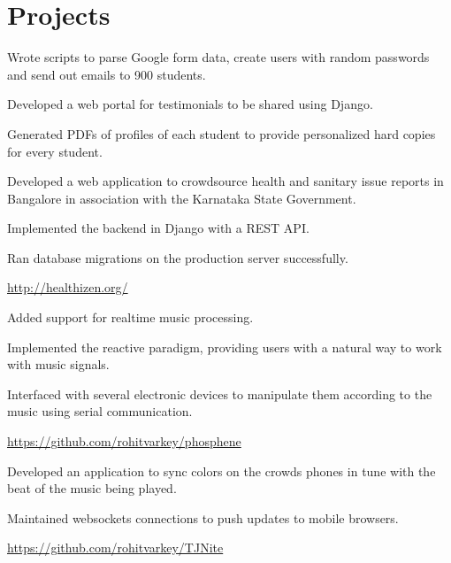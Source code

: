 \documentclass[]{deedy-resume-openfont}
\begin{document}
\begin{minipage}[t]{0.49\textwidth} 

\section{Projects}

\sectionsep
\begin{tightemize}
\item Wrote scripts to parse Google form data, create users with random passwords and send out emails to 900 students.
\item Developed a web portal for testimonials to be shared using Django.
\item Generated PDFs of profiles of each student to provide personalized hard copies for every student.
\end{tightemize}

\begin{tightemize}
\item Developed a web application to crowdsource health and sanitary issue reports in Bangalore in association with the Karnataka State Government.
\item Implemented the backend in Django with a REST API.
\item Ran database migrations on the production server successfully.
\item \href{http://healthizen.org/}{http://healthizen.org/}
\end{tightemize}

\begin{tightemize}
\item Added support for realtime music processing.
\item Implemented the reactive paradigm, providing users with a natural way to work with music signals.
\item Interfaced with several electronic devices to manipulate them according to the music using serial communication.
\item \href{https://github.com/rohitvarkey/phosphene}{https://github.com/rohitvarkey/phosphene}
\end{tightemize}

\begin{tightemize}
\item Developed an application to sync colors on the crowds phones in tune with the beat of the music being played.
\item Maintained websockets connections to push updates to mobile browsers.
\item \href{https://github.com/rohitvarkey/TJNite}{https://github.com/rohitvarkey/TJNite}
\end{tightemize}

\end{minipage}
\end{document}
